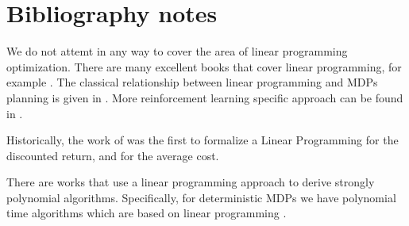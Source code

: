 
% 
% 
% 


\section{Bibliography notes}


We do not attemt in any way to cover the area of linear programming optimization.
There are many excellent books that cover linear programming, for example \cite{Karloff-LP,chvatal1983linear,vanderbei1998linear}. 
The classical relationship between linear programming and MDPs planning is given in \cite{puterman2014markov}. More reinforcement learning specific approach can be found in \cite{FariasR03}.

Historically, the work of \cite{d1963probabilistic} was the first to formalize a Linear Programming for the discounted return, and \cite{manne1960linear} for the average cost. 

There are works that use a linear programming approach to derive strongly polynomial algorithms. Specifically, for deterministic MDPs we have polynomial time algorithms which are based on linear programming \cite{MadaniTZ10,PostY13}.